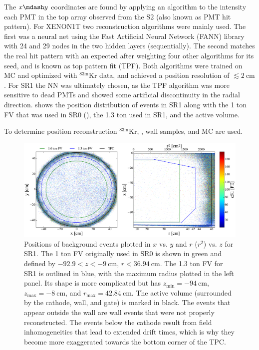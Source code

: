 The $x \mdash y$ coordinates are found by applying an algorithm to the intensity each PMT in the top array observed from the S2 (also known as
PMT hit pattern).  For XENON1T two reconstruction algorithms were mainly used.  The first was a neural net using the Fast Artificial
Neural Network (FANN) library with 24 and 29 nodes in the two hidden layers (sequentially).  The second matches the real hit pattern with
an expected after weighting four other algorithms for its seed, and is known as top pattern fit (TPF).  Both algorithms were trained on MC
and optimized with $\mathrm{^{83m}Kr}$ data, and achieved a position resolution of $\lesssim 2\ \mathrm{cm}$.  For SR1 the NN was ultimately
chosen, as the TPF algorithm was more sensitive to dead PMTs and showed some artificial discontinuity in the radial
direction.   shows the position distribution of events in SR1 along with the 1 ton FV
that was used in SR0 (), the 1.3 ton used in SR1, and the active volume.

To determine position reconstruction $\mathrm{^{83m}Kr}$, , wall samples, and MC are used.

\begin{figure}
\centering
\includegraphics[width=\textwidth]{FVBoth}
\caption{Positions of background events plotted in $x$ vs. $y$ and $r$ ($r^2$) vs. $z$ for SR1.  The 1 ton FV originally used
in SR0 is shown in green and defined by $-92.9 < z < -9\ \mathrm{cm}$, $r < 36.94\ \mathrm{cm}$.  The 1.3 ton FV for SR1 is outlined in
blue, with the maximum radius plotted in the left panel.  Its shape is more complicated but has $z_\mathrm{min} = -94\ \mathrm{cm}$,
$z_{\mathrm{max}} = -8\ \mathrm{cm}$, and $r_{\mathrm{max}} = 42.84\ \mathrm{cm}$.  The active volume (surrounded by the cathode, wall,
and gate) is marked in black.  The events that appear outside the wall are wall events that were not properly
reconstructed.  The events below the cathode result from field inhomogeneities that lead to extended drift times, which is why they
become more exaggerated towards the bottom corner of the TPC.}
\label{fig:calibrations_position_reconstruction}
\end{figure}


